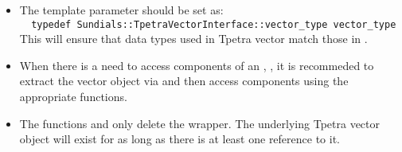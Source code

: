 \begin{itemize}

\item

  The template parameter  should be set as:\\
  \verb|  typedef Sundials::TpetraVectorInterface::vector_type vector_type|\\
   This will ensure that data types used in Tpetra vector match those in {\sundials}.

\item
  When there is a need to access components of an , ,
  it is recommeded to extract the {\trilinos} vector object via
   and then access components using
  the appropriate {\trilinos} functions.

\item
  The functions  and 
  only delete the  wrapper. The underlying Tpetra vector object will exist for as long as
  there is at least one reference to it.

\end{itemize}
